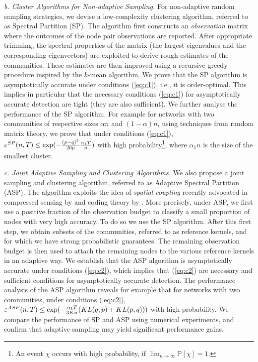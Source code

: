 \documentclass[12pt]{colt}%
\begin{document}
\medskip
\noindent
{\it b. Cluster Algorithms for Non-adaptive Sampling.} For non-adaptive random sampling strategies, we devise a low-complexity clustering algorithm, referred to as Spectral Partition (SP). The algorithm first constructs an {\it observation} matrix where the outcomes of the node pair observations are reported. After appropriate trimming, the spectral properties of the matrix (the largest eigenvalues and the corresponding eigenvectors) are exploited to derive rough estimates of the communities. These estimates are then improved using a recursive greedy procedure inspired by the $k$-mean algorithm. We prove that the SP algorithm is asymptotically accurate under conditions (\ref{eq:c1}), i.e., it is order-optimal. This implies in particular that the necessary conditions (\ref{eq:c1}) for asymptotically accurate detection are tight (they are also sufficient). We further analyse the performance of the SP algorithm. For example for networks with two communities of respective sizes $\alpha n$ and $(1-\alpha)n$, using techniques from random matrix theory, we prove that under conditions (\ref{eq:c1}), $\varepsilon^{SP}(n,T)\le \exp(-{(p-q)^2\over 20 p}{\alpha_1 T\over n})$ with high probability\footnote{An event $\chi$ occurs with high probability, if $\lim_{n \to \infty} \mathbb{P}[\chi] = 1$.}, where $\alpha_1 n $ is  the size of the smallest cluster. 

\medskip
\noindent
{\it c. Joint Adaptive Sampling and Clustering Algorithms.} We also propose a joint sampling and clustering algorithm, referred to as Adaptive Spectral Partition (ASP). The algorithm exploits the idea of {\it spatial coupling} recently advocated in compressed sensing by \cite{krzakala2012} and coding theory by \cite{kudekar2011}. More precisely, under ASP, we first use a positive fraction of the observation budget to classify a small proportion of nodes with very high accuracy. To do so we use the SP algorithm. After this first step, we obtain subsets of the communities, referred to as reference kernels, and for which we have strong probabilistic guarantees. The remaining observation budget is then used to attach the remaining nodes to the various reference kernels in an adaptive way. We establish that the ASP algorithm is asymptotically accurate under conditions (\ref{eq:c2}), which implies that (\ref{eq:c2}) are necessary and sufficient conditions for asymptotically accurate detection. The performance analysis of the ASP algorithm reveals for example that for networks with two communities, under conditions (\ref{eq:c2}), $\varepsilon^{ASP}(n,T)\le \exp(-{\alpha_1 T\over 3Kn}(KL(q,p)+KL(p,q)))$ with high probability. We compare the performance of SP and ASP using numerical experiments, and confirm that adaptive sampling may yield significant performance gains.
\end{document}
